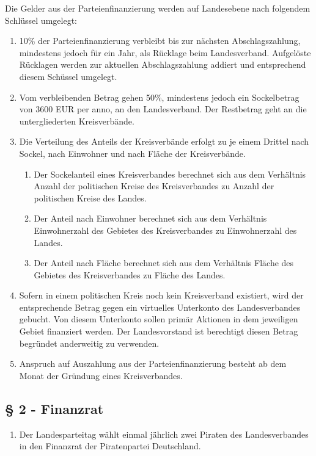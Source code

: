 \documentclass[draft,a4paper,10pt]{article}
\begin{document}
Die Gelder aus der Parteienfinanzierung werden auf Landesebene nach folgendem
Schlüssel umgelegt:
\begin{enumerate}
\item 10\% der Parteienfinanzierung verbleibt bis zur nächsten Abschlagszahlung,
mindestens jedoch für ein Jahr, als Rücklage beim Landesverband. Aufgelöste
Rücklagen werden zur aktuellen Abschlagszahlung addiert und entsprechend diesem
Schüssel umgelegt.

\item Vom verbleibenden Betrag gehen 50\%, mindestens jedoch ein Sockelbetrag
von 3600 EUR per anno, an den Landesverband. Der Restbetrag geht an die
untergliederten Kreisverbände.

\item Die Verteilung des Anteils der Kreisverbände erfolgt zu je einem Drittel
nach Sockel, nach Einwohner und nach Fläche der Kreisverbände.
\begin{enumerate}
\item Der Sockelanteil eines Kreisverbandes berechnet sich aus dem Verhältnis
Anzahl der politischen Kreise des Kreisverbandes zu Anzahl der politischen
Kreise des Landes.

\item Der Anteil nach Einwohner berechnet sich aus dem Verhältnis Einwohnerzahl
des Gebietes des Kreisverbandes zu Einwohnerzahl des Landes.

\item Der Anteil nach Fläche berechnet sich aus dem Verhältnis Fläche des
Gebietes des Kreisverbandes zu Fläche des Landes.
\end{enumerate}

\item Sofern in einem politischen Kreis noch kein Kreisverband existiert, wird
der entsprechende Betrag gegen ein virtuelles Unterkonto des Landesverbandes
gebucht. Von diesem Unterkonto sollen primär Aktionen in dem jeweiligen Gebiet
finanziert werden. Der Landesvorstand ist berechtigt diesen Betrag begründet
anderweitig zu verwenden.

\item Anspruch auf Auszahlung aus der Parteienfinanzierung besteht ab dem Monat
der Gründung eines Kreisverbandes.
\end{enumerate}

\subsection{§ 2 - Finanzrat }
\begin{enumerate}
\item Der Landesparteitag wählt einmal jährlich zwei Piraten des Landesverbandes
in den Finanzrat der Piratenpartei Deutschland.
\end{enumerate}
\end{document}
